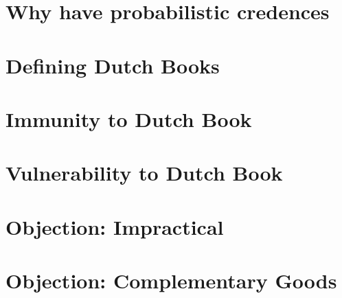 \section{Why have probabilistic credences}

\section{Defining Dutch Books}

\section{Immunity to Dutch Book}

\section{Vulnerability to Dutch Book}

\section{Objection: Impractical}

\section{Objection: Complementary Goods}